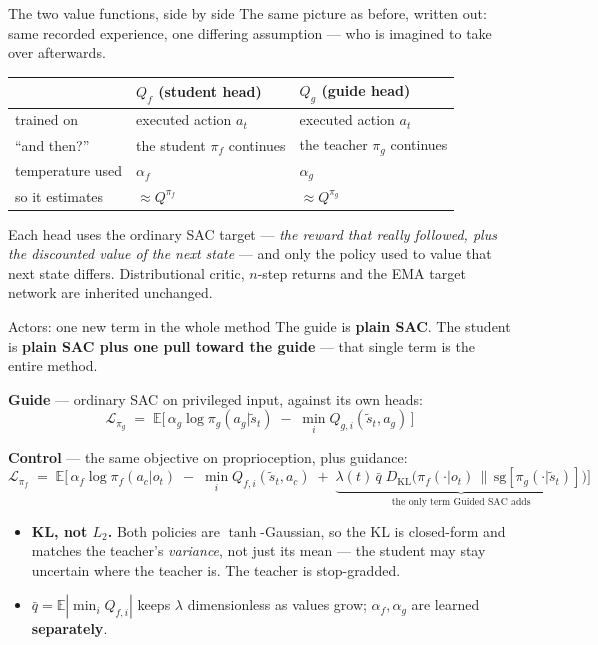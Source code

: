 \documentclass[aspectratio=169]{beamer}
\newcommand{\ot}{o_t}
\newcommand{\st}{\tilde{s}_t}
\newcommand{\pf}{\pi_f}
\newcommand{\pg}{\pi_g}
\begin{document}
\begin{frame}{The two value functions, side by side}
  {\footnotesize The same picture as before, written out: same recorded experience, one
  differing assumption --- who is imagined to take over afterwards.}

  \vspace{0.7em}
  \begin{center}\footnotesize
  \begin{tabular}{lll}
    \toprule
    & \textbf{$Q_f$ (student head)} & \textbf{$Q_g$ (guide head)} \\
    \midrule
    trained on & executed action $a_t$ & executed action $a_t$ \\
    ``and then?'' & the student $\pf$ continues & the teacher $\pg$ continues \\
    temperature used & $\alpha_f$ & $\alpha_g$ \\
    so it estimates & $\approx Q^{\pf}$ & $\approx Q^{\pg}$ \\
    \bottomrule
  \end{tabular}
  \end{center}

  \vspace{0.3em}
  {\footnotesize Each head uses the ordinary SAC target --- \emph{the reward that really
  followed, plus the discounted value of the next state} --- and only the policy used to value
  that next state differs. Distributional critic, $n$-step returns and the EMA target network
  are inherited unchanged.}
\end{frame}

\begin{frame}{Actors: one new term in the whole method}
  \relax
  {\footnotesize The guide is \textbf{plain SAC}. The student is \textbf{plain SAC plus one pull
  toward the guide} --- that single term is the entire method.}

  \textbf{Guide} --- ordinary SAC on privileged input, against its own heads:
  \[ \mathcal{L}_{\pg} \;=\; \mathbb{E}\Big[\, \alpha_g \log \pg(a_g|\st) \;-\; \min_i Q_{g,i}(\st, a_g) \,\Big] \]

  \textbf{Control} --- the same objective on proprioception, plus guidance:
  \[ \mathcal{L}_{\pf} \;=\; \mathbb{E}\Big[\, \alpha_f \log \pf(a_c|\ot) \;-\; \min_i Q_{f,i}(\st, a_c)
     \;+\; \underbrace{\lambda(t)\,\bar{q}\; D_{\mathrm{KL}}\big(\pf(\cdot|\ot)\,\big\|\,\mathrm{sg}[\pg(\cdot|\st)]\big)}_{\text{the only term Guided SAC adds}} \Big] \]

  \begin{itemize}\footnotesize
    \item \textbf{KL, not $L_2$.} Both policies are $\tanh$-Gaussian, so the KL is closed-form
          and matches the teacher's \emph{variance}, not just its mean --- the student may stay
          uncertain where the teacher is. The teacher is stop-gradded.
    \item $\bar{q} = \mathbb{E}|\min_i Q_{f,i}|$ keeps $\lambda$ dimensionless as values grow;
          $\alpha_f, \alpha_g$ are learned \textbf{separately}.
  \end{itemize}
\end{frame}
\end{document}
